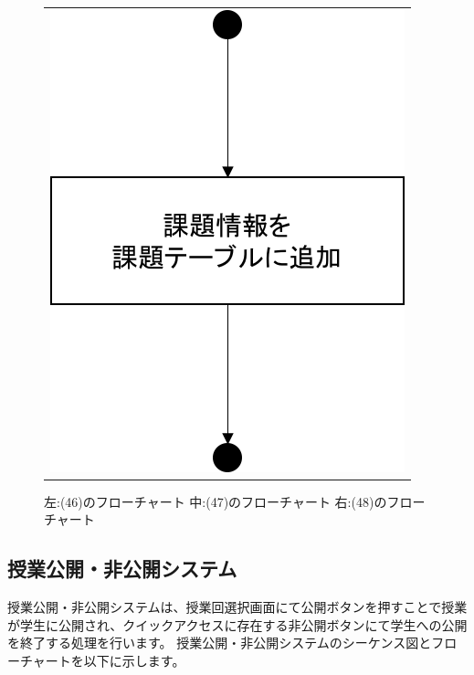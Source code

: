 \begin{figure}[htbp]
\begin{tabular}{c}
 \begin{minipage}{0.33\hsize}
  \begin{center}
   \includegraphics[width=0.8\linewidth,clip]{./img/flow/48.png}
  \end{center}
 \end{minipage}
\end{tabular}
 \caption{左:(46)のフローチャート 中:(47)のフローチャート 右:(48)のフローチャート}\label{fig:46to47to48}
\end{figure}
\clearpage




\subsection{授業公開・非公開システム}
授業公開・非公開システムは、授業回選択画面にて公開ボタンを押すことで授業が学生に公開され、クイックアクセスに存在する非公開ボタンにて学生への公開を終了する処理を行います。
授業公開・非公開システムのシーケンス図とフローチャートを以下に示します。

